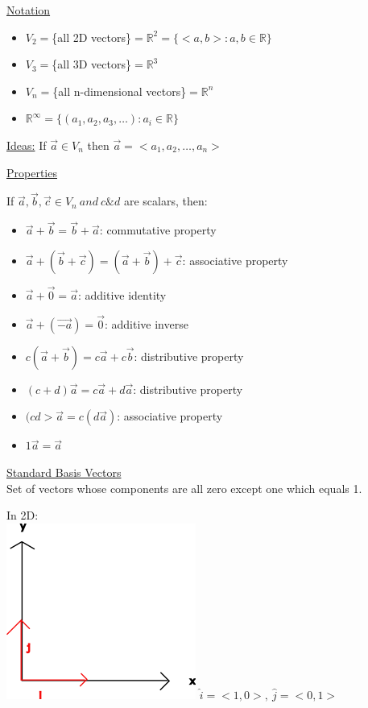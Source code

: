 \documentclass[10pt]{article}
\begin{document}
\underline{Notation}
\begin{itemize}
	\item $V_2=$\{all 2D vectors\}$=\mathbb{R}^2=\{<a,b>:a,b\in\mathbb{R}\}$
	\item $V_3=$\{all 3D vectors\}$=\mathbb{R}^3$
	\item $V_n=$\{all n-dimensional vectors\}$=\mathbb{R}^n$
	\item $\mathbb{R}^\infty=\{(a_1,a_2,a_3,\hdots):a_i\in\mathbb{R}\}$
\end{itemize}

\underline{Ideas:} If $\vec{a} \in V_n $ then $\vec{a}  = <a_1,a_2,\hdots,a_n> $

\underline{Properties}

If $\vec{a} , \vec{b} , \vec{c} \in V_n\ and\ c\&d   $ are scalars, then:
\begin{itemize}
	\item $\vec{a} + \vec{b}  = \vec{b}  + \vec{a}     $: commutative property
	\item $\vec{a} +(\vec{b} +\vec{c} )=(\vec{a} +\vec{b} )+\vec{c}       $: associative property
	\item $\vec{a} +\vec{0} =\vec{a}    $: additive identity
	\item $\vec{a} +(\vec{-a} )=\vec{0}    $: additive inverse 
	\item $c(\vec{a} +\vec{b} )=c \vec{a} + c \vec{b}     $: distributive property
	\item $(c+d)\vec{a} =c \vec{a}  + d \vec{a}    $: distributive property
	\item $(cd>\vec{a} =c(d \vec{a} )  $: associative property
	\item $1 \vec{a} =\vec{a}   $
\end{itemize}

\underline{Standard Basis Vectors}\\Set of vectors whose components are all zero except one which equals 1.

In 2D:\\\includegraphics{standardbasisvectors} $\hat{i}=<1,0>,\ \hat{j}=<0,1>$
\end{document}
